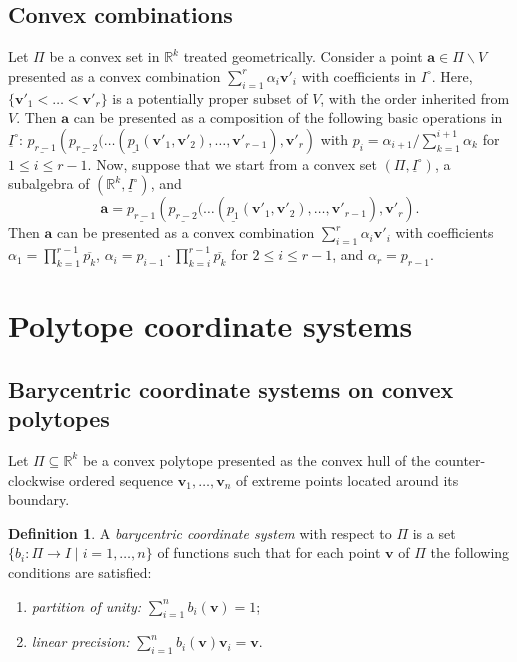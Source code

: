 \documentclass[12pt]{amsart}
\theoremstyle{plain}
\theoremstyle{definition}
\newtheorem{definition}[theorem]{Definition}
\numberwithin{equation}{section}
\begin{document}
\subsection{Convex combinations}\label{Ss:Coco}
Let $\Pi$ be a convex set in $\mathbb{R}^k$ treated geometrically. Consider a point $\mathbf{a}\in \Pi\smallsetminus V$ presented as a convex combination $\sum_{i=1}^{r} \alpha_i\mathbf{v}'_i$ with coefficients in $I^\circ$. Here, $\{\mathbf{v}'_1<\ldots<\mathbf{v}'_r\}$ is a potentially proper subset of $V$, with the order inherited from $V$. Then $\mathbf{a}$ can be presented as a composition of the following basic operations in $\underline{I}^{\circ}$: $\underline{p_{r-1}}\left(\underline{p_{r-2}}(\ldots (\underline{p_{1}}(\mathbf{v}'_1,\mathbf{v}'_2),\ldots ,\mathbf{v}'_{r-1}),\mathbf{v}'_r \right)$ with $p_i={\alpha_{i+1}}\big/{\sum_{k=1}^{i+1}\alpha_{k}}$ for $1\leq i\leq r-1$. Now, suppose that we start from a convex set $(\Pi,\underline{I}^{\circ})$, a subalgebra of $(\mathbb{R}^k,\underline{I}^{\circ})$, and
$$
\mathbf{a}=\underline{p_{r-1}}\left(\underline{p_{r-2}}(\ldots (\underline{p_{1}}(\mathbf{v}'_1,\mathbf{v}'_2),\ldots ,\mathbf{v}'_{r-1}),\mathbf{v}'_r \right).
$$
Then $\mathbf{a}$ can be presented as a convex combination $\sum_{i=1}^{r} \alpha_i\mathbf{v}'_i$ with coefficients $\alpha_1=\prod_{k=1}^{r-1}\overline{p_{k}}$, $\alpha_i=p_{i-1}\cdot \prod_{k=i}^{r-1}\overline{p_{k}}$ for $2\leq i\leq r-1$, and $\alpha_r=p_{r-1}$.


\section{Polytope coordinate systems}\label{S:pcs}


\subsection{Barycentric coordinate systems on convex polytopes}\label{Ss:gbc}

Let $\Pi\subseteq\mathbb{R}^k$ be a convex polytope presented as the convex hull of the counter-clockwise ordered sequence $\mathbf v_1,\dots,\mathbf v_n$ of extreme points located around its boundary.

\begin{definition}\cite{FloaterGBCA, WarSchHirDes}
A \emph{barycentric coordinate system} with respect to $\Pi$ is a set $\{b_i\colon\Pi\rightarrow I\mid i=1,\ldots ,n\}$ of functions such that for each point $\mathbf v$ of $\Pi$ the following conditions are satisfied:
\begin{enumerate}
\item[$(\mathrm a)$] \emph{partition of unity:} $\sum_{i=1}^{n}b_i(\mathbf v)=1$;
\item[$(\mathrm b)$] \emph{linear precision:} $\sum_{i=1}^{n}b_i(\mathbf v)\mathbf v_i=\mathbf v$.
\end{enumerate}
\end{definition}
\end{document}
